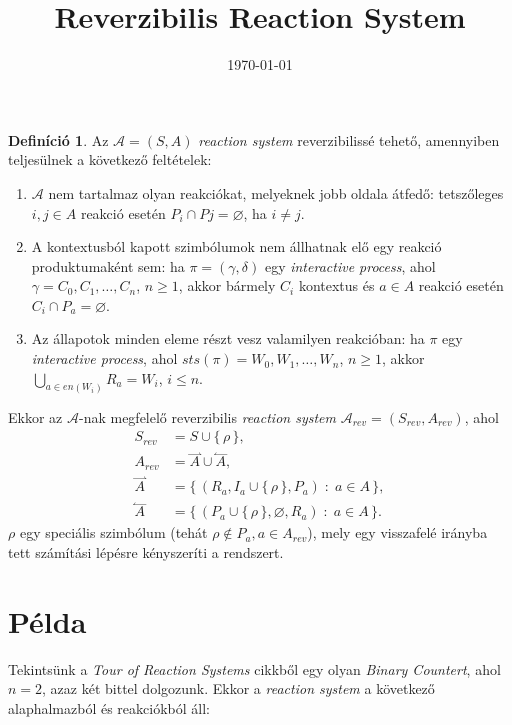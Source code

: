 \documentclass[12pt]{article}
\title{Reverzibilis Reaction System}
\date{\today}
\theoremstyle{definition}
\newtheorem*{definition*}{Definíció}
\let\emptyset\varnothing
\newcommand{\forwardhat}{\overset{\rightharpoonup}}
\newcommand{\backwardhat}{\overset{\leftharpoonup}}
\begin{document}
    \maketitle

    \begin{definition*}
        Az $\mathcal{A} = (S, A)$ \textit{reaction system} reverzibilissé tehető, amennyiben teljesülnek a következő feltételek:
        \begin{enumerate}[label={(\arabic*)}]
            \item
            $\mathcal{A}$ nem tartalmaz olyan reakciókat, melyeknek jobb oldala átfedő: tetszőleges $i, j \in A$ reakció esetén $P_{i} \cap P{j} = \emptyset$, ha $i \neq j$.

            \item
            A kontextusból kapott szimbólumok nem állhatnak elő egy reakció produktumaként sem: ha $\pi = (\gamma, \delta)$ egy \textit{interactive process}, ahol $\gamma = C_{0}, C_{1}, \ldots, C_{n}$, $n \geq 1$, akkor bármely $C_{i}$ kontextus és $a \in A$ reakció esetén $C_{i} \cap P_{a} = \emptyset$.

            \item
            Az állapotok minden eleme részt vesz valamilyen reakcióban: ha $\pi$ egy \textit{interactive process}, ahol $\textit{sts}(\pi) = W_{0}, W_{1}, \ldots, W_{n}$, $n \geq 1$, akkor $\bigcup_{a \in \textit{en}(W_{i})} R_{a} = W_{i}$, $i \leq n$.
        \end{enumerate}
        Ekkor az $\mathcal{A}$-nak megfelelő reverzibilis \textit{reaction system} $\mathcal{A}_{\textit{rev}} = (S_{\textit{rev}}, A_{\textit{rev}})$, ahol
        \begin{align*}
            S_{\textit{rev}} &= S \cup \{ \, \rho \, \}, \\
            A_{\textit{rev}} &= \forwardhat A \cup \backwardhat A, \\ 
            \forwardhat A &= \{ \, (R_{a}, I_{a} \cup \{ \, \rho \, \}, P_{a}) \; : \; a \in A \, \}, \\
            \backwardhat A &= \{ \, (P_{a} \cup \{ \, \rho \, \}, \emptyset, R_{a}) \; : \; a \in A \, \}.
        \end{align*}
        $\rho$ egy speciális szimbólum (tehát $\rho \notin P_{a}, a \in A_{\textit{rev}}$), mely egy visszafelé irányba tett számítási lépésre kényszeríti a rendszert.
    \end{definition*}

    \section*{Példa}
    Tekintsünk a \textit{Tour of Reaction Systems} cikkből egy olyan \textit{Binary Countert}, ahol $n = 2$, azaz két bittel dolgozunk. Ekkor a \textit{reaction system} a következő alaphalmazból és reakciókból áll:
\end{document}
